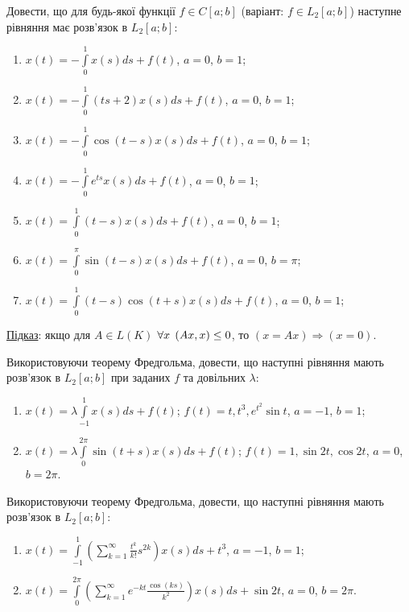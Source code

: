 \begin{exercise}
    Довести, що для будь-якої функції $f \in C[a;b]$ (варіант: $f \in L_2[a;b]$)
    наступне рівняння має розв'язок в $L_2[a;b]$:
    \begin{enumerate}
        \item $x(t) = -\int\limits^1_0 x(s) ds + f(t)$, $a=0$, $b=1$;
        \item $x(t) = -\int\limits^1_0 (ts+2)x(s)ds + f(t)$, $a=0$, $b=1$;
        \item $x(t) = -\int\limits^1_0 \cos(t-s)x(s)ds + f(t)$, $a=0$, $b=1$;
        \item $x(t) = -\int\limits^1_0 e^{ts}x(s)ds + f(t)$, $a=0$, $b=1$;
        \item $x(t) = \int\limits^1_0 (t-s)x(s)ds + f(t)$, $a=0$, $b=1$;
        \item $x(t) = \int\limits^\pi_0 \sin(t-s)x(s)ds + f(t)$, $a=0$, $b=\pi$;
        \item $x(t) = \int\limits^1_0 (t-s)\cos(t+s)x(s)ds + f(t)$, $a=0$, $b=1$;
    \end{enumerate}
\end{exercise}

\begin{theory}
    \ul{Підказ}: якщо для $A\in L(K)$ $\forall x \; \left(Ax, x\right) \leq 0$,
    то $(x=Ax) \Rightarrow (x=0)$.
\end{theory}

\begin{exercise}
    Використовуючи теорему Фредгольма, довести, що наступні рівняння мають розв'язок в $L_2[a;b]$
    при заданих $f$ та довільних $\lambda$:
    \begin{enumerate}
        \item $x(t) = \lambda \int\limits^1_{-1} x(s) ds + f(t)$;
              $f(t) = t, t^3, e^{t^2}\sin t$, $a=-1$, $b=1$;
        \item $x(t) = \lambda \int\limits^{2\pi}_0 \sin(t+s) x(s) ds + f(t)$; 
              $f(t) = 1, \sin 2t, \cos 2t$, $a=0$, $b=2\pi$.
    \end{enumerate}
\end{exercise}

\begin{exercise}
    Використовуючи теорему Фредгольма, довести, що наступні рівняння мають розв'язок в $L_2[a;b]$:
    \begin{enumerate}
        \item $x(t) = \int\limits^1_{-1} \left(
                \sum\limits^\infty_{k=1} \frac{t^k}{k!} s^{2k}
            \right) x(s) ds + t^3$, $a=-1$, $b=1$;
        \item $x(t) = \int\limits^{2\pi}_0 \left(
                \sum\limits^\infty_{k=1} e^{-kt} \frac{\cos(ks)}{k^2}
            \right) x(s) ds + \sin 2t$, $a=0$, $b=2\pi$.
    \end{enumerate}
\end{exercise}

